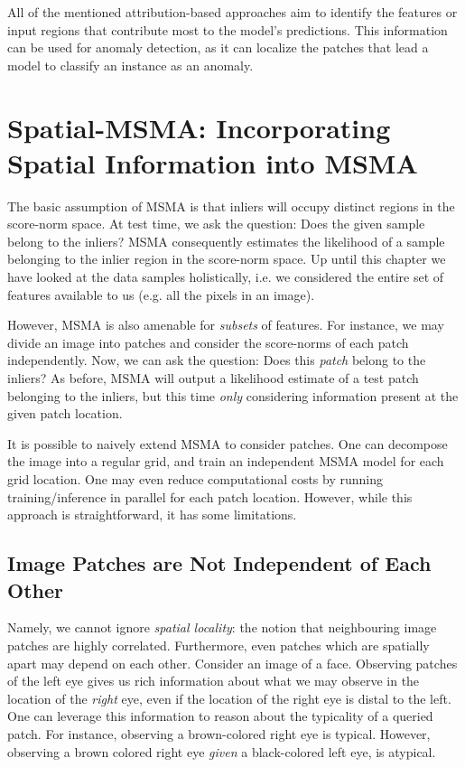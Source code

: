 All of the mentioned attribution-based approaches aim to identify the features or input regions that contribute most to the model's predictions. This information can be used for anomaly detection, as it can localize the patches that lead a model to classify an instance as an anomaly.

\section{Spatial-MSMA: Incorporating Spatial Information into MSMA}
The basic assumption of MSMA is that inliers will occupy distinct regions in the score-norm space. At test time, we ask the question: Does the given sample belong to the inliers? MSMA consequently estimates the likelihood of a sample belonging to the inlier region in the score-norm space. Up until this chapter we have looked at the data samples holistically, i.e. we considered the entire set of features available to us (e.g. all the pixels in an image). 

However, MSMA is also amenable for \textit{subsets} of features. For instance, we may divide an image into patches and consider the score-norms of each patch independently. Now, we can ask the question: Does this \textit{patch} belong to the inliers? As before, MSMA will output a likelihood estimate of a test patch belonging to the inliers, but this time \textit{only} considering information present at the given patch location.

It is possible to naively extend MSMA to consider patches. One can decompose the image into a regular grid, and train an independent MSMA model for each grid location. One may even reduce computational costs by running training/inference in parallel for each patch location. However, while this approach is straightforward, it has some limitations.

\subsection*{Image Patches are Not Independent of Each Other}
Namely, we cannot ignore \textit{spatial locality}: the notion that neighbouring image patches are highly correlated. Furthermore, even patches which are spatially apart may depend on each other. Consider an image of a face.
Observing patches of the left eye gives us rich information about what we may observe in the location of the \textit{right} eye, even if the location of the right eye is distal to the left.
One can leverage this information to reason about the typicality of a queried patch. For instance, observing a brown-colored right eye is typical. However, observing a brown colored right eye \textit{given} a black-colored left eye, is atypical.

